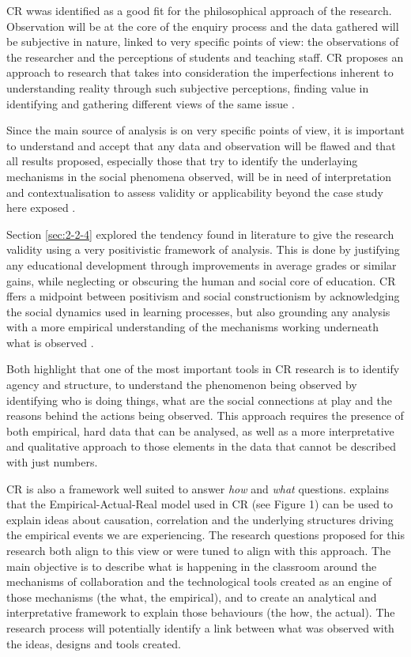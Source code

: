 \ac{CR} wwas identified as a good fit for the philosophical approach of the research. Observation will be at the core of the enquiry process and the data gathered will be subjective
in nature, linked to very specific points of view: the observations of the researcher and the perceptions of students and teaching staff. \ac{CR} proposes an approach to research that
takes into consideration the imperfections inherent to understanding reality through such subjective perceptions, finding value in identifying and gathering different views of the same
issue \parencite{hastings_2021,bryman_2003}.

Since the main source of analysis is on very specific points of view, it is important to understand and accept that any data and observation will be flawed and that all results proposed,
especially those that try to identify the underlaying mechanisms in the social phenomena observed, will be in need of interpretation and contextualisation to assess validity or applicability
beyond the case study here exposed  \parencite{easton_2010}.

Section \ref{sec:2-2-4} explored the tendency found in literature to give the research validity using a very positivistic framework of analysis. This is done by justifying any educational
development through improvements in average grades or similar gains, while neglecting or obscuring the human and social core of education. \ac{CR} ffers a midpoint between positivism and
social constructionism by acknowledging the social dynamics used in learning processes, but also grounding any analysis with a more empirical understanding of the mechanisms working
underneath what is observed \parencite{parra_2021}.

Both \textcite{carter_2004, scott_2005} highlight that one of the most important tools in \ac{CR} research is to identify agency and structure, to understand the phenomenon being observed
by identifying who is doing things, what are the social connections at play and the reasons behind the actions being observed. This approach requires the presence of both empirical, hard
data that can be analysed, as well as a more interpretative and qualitative approach to those elements in the data that cannot be described with just numbers.

\ac{CR} is also a framework well suited to answer \emph{how} and \emph{what} questions. \textcite{wang_2021} explains that the Empirical-Actual-Real model used in \ac{CR}
(see Figure 1) can be used to explain ideas about causation, correlation and the underlying structures driving the empirical events we are experiencing. The research questions proposed for
this research both align to this view or were tuned to align with this approach. The main objective is to describe what is happening in the classroom around the mechanisms of collaboration
and the technological tools created as an engine of those mechanisms (the what, the empirical), and to create an analytical and interpretative framework to explain those behaviours (the how,
the actual). The research process will potentially identify a link between what was observed with the ideas, designs and tools created.

